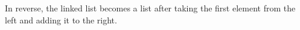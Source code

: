 \documentclass[preview]{standalone}
\begin{document}
In reverse, the linked list becomes a list after taking the first element from the left and adding it to the right.\\
\end{document}
